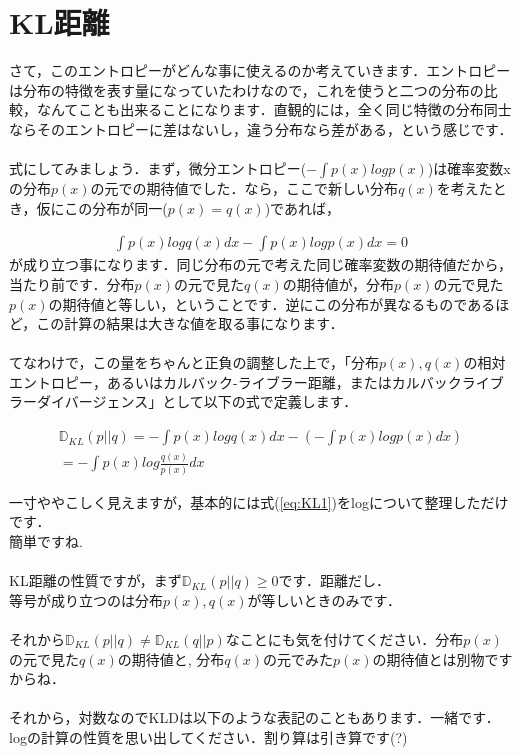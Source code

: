 \documentclass[11pt,a4paper,uplatex]{ujreport}
\begin{document}
\section{KL距離}
さて，このエントロピーがどんな事に使えるのか考えていきます．エントロピーは分布の特徴を表す量になっていたわけなので，これを使うと二つの分布の比較，なんてことも出来ることになります．直観的には，全く同じ特徴の分布同士ならそのエントロピーに差はないし，違う分布なら差がある，という感じです．\\
\\
式にしてみましょう．まず，微分エントロピー($- \int p(x) log p(x)$)は確率変数xの分布$p(x)$の元での期待値でした．なら，ここで新しい分布$q(x)$を考えたとき，仮にこの分布が同一($p(x) = q(x)$)であれば，

\begin{eqnarray}
\label{eq:KL1}
  \int p(x) log q(x)dx - \int p(x) log p(x)dx= 0
\end{eqnarray}
が成り立つ事になります．同じ分布の元で考えた同じ確率変数の期待値だから，当たり前です．分布$p(x)$の元で見た$q(x)$の期待値が，分布$p(x)$の元で見た$p(x)$の期待値と等しい，ということです．逆にこの分布が異なるものであるほど，この計算の結果は大きな値を取る事になります．\\
\\
てなわけで，この量をちゃんと正負の調整した上で，「分布$p(x), q(x)$の相対エントロピー，あるいはカルバック-ライブラー距離，またはカルバックライブラーダイバージェンス」として以下の式で定義します\cite{prml}．

\begin{eqnarray}
\label{eq:KLD}
  \mathbb{D}_{KL}(p||q) = - \int p(x) log q(x)dx - (-\int p(x) log p(x)dx)\\
  = -\int p(x) log \frac{q(x)}{p(x)} dx
\end{eqnarray}

一寸ややこしく見えますが，基本的には式(\ref{eq:KL1})をlogについて整理しただけです．\\簡単ですね.\\
\\

KL距離の性質ですが，まず$\mathbb{D}_{KL}(p||q) \geq 0$です．距離だし．\\
等号が成り立つのは分布$p(x), q(x)$が等しいときのみです．\\
\\
それから$\mathbb{D}_{KL}(p||q) \neq \mathbb{D}_{KL}(q||p)$なことにも気を付けてください．分布$p(x)$の元で見た$q(x)$の期待値と, 分布$q(x)$の元でみた$p(x)$の期待値とは別物ですからね．\\
\\
それから，対数なのでKLDは以下のような表記のこともあります．一緒です．logの計算の性質を思い出してください．割り算は引き算です(?)
\end{document}
